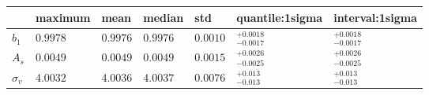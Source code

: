 \begin{tabular}{lllllll}
\hline
              & maximum   & mean     & median   & std      & quantile:1sigma          & interval:1sigma          \\
\hline
 $b_{1}$      & $0.9978$  & $0.9976$ & $0.9976$ & $0.0010$ & ${}_{-0.0017}^{+0.0018}$ & ${}_{-0.0017}^{+0.0018}$ \\
 $A_{s}$      & $0.0049$  & $0.0049$ & $0.0049$ & $0.0015$ & ${}_{-0.0025}^{+0.0026}$ & ${}_{-0.0025}^{+0.0026}$ \\
 $\sigma_{v}$ & $4.0032$  & $4.0036$ & $4.0037$ & $0.0076$ & ${}_{-0.013}^{+0.013}$   & ${}_{-0.013}^{+0.013}$   \\
\hline
\end{tabular}